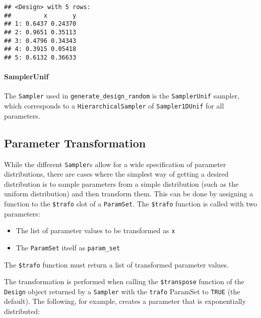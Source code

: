 \documentclass[
]{scrbook}
\providecommand{\tightlist}{%
  \setlength{\itemsep}{0pt}\setlength{\parskip}{0pt}}
\begin{document}
\begin{verbatim}
## <Design> with 5 rows:
##         x       y
## 1: 0.6437 0.24370
## 2: 0.9651 0.35113
## 3: 0.4796 0.34343
## 4: 0.3915 0.05418
## 5: 0.6132 0.36633
\end{verbatim}

\hypertarget{samplerunif}{%
\paragraph{SamplerUnif}\label{samplerunif}}

The \texttt{Sampler} used in \texttt{generate\_design\_random} is the \texttt{SamplerUnif} sampler, which corresponds to a \texttt{HierarchicalSampler} of \texttt{Sampler1DUnif} for all parameters.

\hypertarget{parameter-transformation}{%
\subsection{Parameter Transformation}\label{parameter-transformation}}

While the different \texttt{Sampler}s allow for a wide specification of parameter distributions, there are cases where the simplest way of getting a desired distribution is to sample parameters from a simple distribution (such as the uniform distribution) and then transform them.
This can be done by assigning a function to the \texttt{\$trafo} slot of a \texttt{ParamSet}.
The \texttt{\$trafo} function is called with two parameters:

\begin{itemize}
\tightlist
\item
  The list of parameter values to be transformed as \texttt{x}
\item
  The \texttt{ParamSet} itself as \texttt{param\_set}
\end{itemize}

The \texttt{\$trafo} function must return a list of transformed parameter values.

The transformation is performed when calling the \texttt{\$transpose} function of the \texttt{Design} object returned by a \texttt{Sampler} with the \texttt{trafo} ParamSet to \texttt{TRUE} (the default).
The following, for example, creates a parameter that is exponentially distributed:
\end{document}
